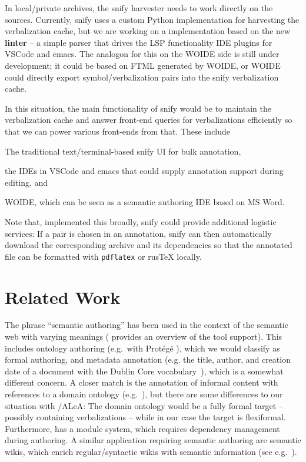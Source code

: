\documentclass[runningheads]{llncs}
\newcommand\ALeA{\textsf{ALeA}\xspace}
\newcommand\snify{\textsf{snify}\xspace}
\newcommand\FTML{\textsf{FTML}\xspace}
\newcommand\WOIDE{\textsf{WOIDE}\xspace}
\begin{document}
In local/private archives, the \snify harvester needs to work directly on the \sTeX
sources.
Currently, \snify uses a custom Python implementation for harvesting the verbalization cache,
but we are working on a implementation based on the new \flams \textbf{linter} -- a simple \sTeX parser that
drives the LSP functionality \sTeX IDE plugins for \textsf{VSCode} and \textsf{emacs}.
The analogon for this on the \WOIDE side is still under development; it
could be based on \FTML generated by \WOIDE, or \WOIDE could directly export symbol/verbalization
pairs into the \snify verbalization cache.

In this situation, the main functionality of \snify would be to maintain the verbalization cache
and answer front-end queries for verbalizations efficiently so that we can power various
front-ends from that. These include
\begin{compactenum}[\em i\rm)]
\item The traditional text/terminal-based \snify UI for bulk annotation,
\item the \sTeX IDEs in \textsf{VSCode} and \textsf{emacs} that could supply annotation
  support during editing, and 
\item \WOIDE, which can be seen as a semantic authoring IDE based on MS Word.
\end{compactenum}

Note that, implemented this broadly, \snify could provide additional logistic services: If a
pair is chosen in an annotation, \snify can then automatically download the corresponding
archive and its dependencies so that the annotated file can be formatted with \texttt{pdflatex} or
\textsf{rus\TeX} locally.

\section{Related Work}\label{sec:relwork}
The phrase ``semantic authoring'' has been used in the
context of the semantic web with varying meanings
(\cite{khalili2013user} provides an overview of the tool support).
This includes ontology authoring (e.g.\ with \textsf{Prot{\'e}g{\'e}}
\cite{musen2015protege}), which we would classify as
formal authoring, and metadata annotation
(e.g. the title, author, and creation date of a document with the Dublin Core vocabulary~\cite{DublinCore:on}),
which is a somewhat different concern.
A closer match is the annotation of
informal content with references to a domain ontology (e.g.\ \cite{goerz2010adaptation}),
but there are some differences to
our situation with \sTeX/\ALeA: The domain ontology would be a fully formal target --
possibly containing verbalizations -- while in our case the target is flexiformal.
Furthermore, \sTeX has a module system, which requires dependency management during
authoring.
A similar application requiring semantic authoring
are semantic wikis, which enrich regular/syntactic
wikis with semantic information
(see e.g.\ \cite{semmediawiki}).
\end{document}

